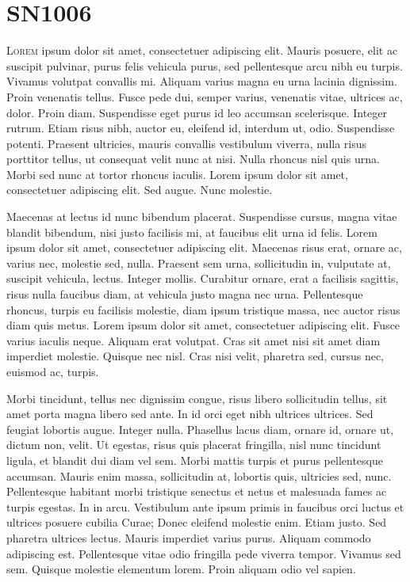 \chapter{SN1006}
\label{chap:three}

\lettrine[lines=4]{L}{orem} ipsum dolor sit amet, consectetuer
adipiscing elit. Mauris posuere, elit ac suscipit pulvinar, purus
felis vehicula purus, sed pellentesque arcu nibh eu turpis. Vivamus
volutpat convallis mi. Aliquam varius magna eu urna lacinia
dignissim. Proin venenatis tellus. Fusce pede dui, semper varius,
venenatis vitae, ultrices ac, dolor. Proin diam. Suspendisse eget
purus id leo accumsan scelerisque. Integer rutrum. Etiam risus nibh,
auctor eu, eleifend id, interdum ut, odio. Suspendisse
potenti. Praesent ultricies, mauris convallis vestibulum viverra,
nulla risus porttitor tellus, ut consequat velit nunc at nisi. Nulla
rhoncus nisl quis urna. Morbi sed nunc at tortor rhoncus
iaculis. Lorem ipsum dolor sit amet, consectetuer adipiscing elit. Sed
augue. Nunc molestie.

Maecenas at lectus id nunc bibendum placerat. Suspendisse cursus,
magna vitae blandit bibendum, nisi justo facilisis mi, at faucibus
elit urna id felis. Lorem ipsum dolor sit amet, consectetuer
adipiscing elit. Maecenas risus erat, ornare ac, varius nec, molestie
sed, nulla. Praesent sem urna, sollicitudin in, vulputate at, suscipit
vehicula, lectus. Integer mollis. Curabitur ornare, erat a facilisis
sagittis, risus nulla faucibus diam, at vehicula justo magna nec
urna. Pellentesque rhoncus, turpis eu facilisis molestie, diam ipsum
tristique massa, nec auctor risus diam quis metus. Lorem ipsum dolor
sit amet, consectetuer adipiscing elit. Fusce varius iaculis
neque. Aliquam erat volutpat. Cras sit amet nisi sit amet diam
imperdiet molestie. Quisque nec nisl. Cras nisi velit, pharetra sed,
cursus nec, euismod ac, turpis.

Morbi tincidunt, tellus nec dignissim congue, risus libero
sollicitudin tellus, sit amet porta magna libero sed ante. In id orci
eget nibh ultrices ultrices. Sed feugiat lobortis augue. Integer
nulla. Phasellus lacus diam, ornare id, ornare ut, dictum non,
velit. Ut egestas, risus quis placerat fringilla, nisl nunc tincidunt
ligula, et blandit dui diam vel sem. Morbi mattis turpis et purus
pellentesque accumsan. Mauris enim massa, sollicitudin at, lobortis
quis, ultricies sed, nunc. Pellentesque habitant morbi tristique
senectus et netus et malesuada fames ac turpis egestas. In in
arcu. Vestibulum ante ipsum primis in faucibus orci luctus et ultrices
posuere cubilia Curae; Donec eleifend molestie enim. Etiam justo. Sed
pharetra ultrices lectus. Mauris imperdiet varius purus. Aliquam
commodo adipiscing est. Pellentesque vitae odio fringilla pede viverra
tempor. Vivamus sed sem. Quisque molestie elementum lorem. Proin
aliquam odio vel sapien.

